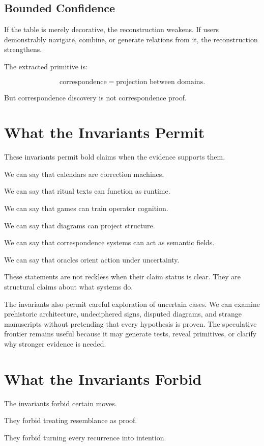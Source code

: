 \documentclass[11pt]{book}
\begin{document}
\subsection{Bounded Confidence}

If the table is merely decorative, the reconstruction weakens. If users demonstrably navigate, combine, or generate relations from it, the reconstruction strengthens.

The extracted primitive is:

\[
\text{correspondence} = \text{projection between domains}.
\]

But correspondence discovery is not correspondence proof.

\section{What the Invariants Permit}

These invariants permit bold claims when the evidence supports them.

We can say that calendars are correction machines.

We can say that ritual texts can function as runtime.

We can say that games can train operator cognition.

We can say that diagrams can project structure.

We can say that correspondence systems can act as semantic fields.

We can say that oracles orient action under uncertainty.

These statements are not reckless when their claim status is clear. They are structural claims about what systems do.

The invariants also permit careful exploration of uncertain cases. We can examine prehistoric architecture, undeciphered signs, disputed diagrams, and strange manuscripts without pretending that every hypothesis is proven. The speculative frontier remains useful because it may generate tests, reveal primitives, or clarify why stronger evidence is needed.

\section{What the Invariants Forbid}

The invariants forbid certain moves.

They forbid treating resemblance as proof.

They forbid turning every recurrence into intention.
\end{document}
